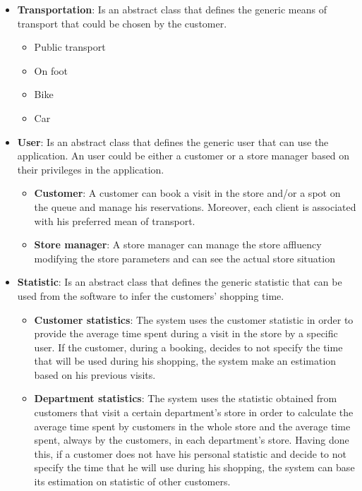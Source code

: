 \documentclass{article}
\begin{document}
			\begin{itemize}
				\item {\bfseries Transportation}: Is an abstract class that defines the generic means of transport that could be chosen by the customer.
				
					\begin{itemize}
						\item Public transport
						\item On foot
						\item Bike
						\item Car
					\end{itemize}
				
				\item {\bfseries User}: Is an abstract class that defines the generic user that can use the application. An user could be either a customer or a store manager based on their privileges in the application.
				
					\begin{itemize}
						\item {\bfseries Customer}: A customer can book a visit in the store and/or a spot on the queue and manage his reservations. Moreover, each client is associated with his preferred mean of transport.						
						\item {\bfseries Store manager}: A store manager can manage the store affluency modifying the store parameters and can see the actual store situation
					\end{itemize}
				
				\item {\bfseries Statistic}: Is an abstract class that defines the generic statistic that can be used from the software to infer the customers' shopping time.			
				\begin{itemize}
					\item {\bfseries Customer statistics}: The system uses the customer statistic in order to provide the average time spent during a visit in the store by a specific user. If the customer, during a booking, decides to not specify the time that will be used during his shopping, the system make an estimation based on his previous visits.
					
					\item {\bfseries Department statistics}: The system uses the statistic obtained from customers that visit a certain department's store in order to calculate the average time spent by customers in the whole store and the average time spent, always by the customers, in each department's store. Having done this, if a customer does not have his personal statistic and decide to not specify the time that he will use during his shopping, the system can base its estimation on statistic of other customers.
				

\end{itemize}
\end{itemize}
\end{document}
